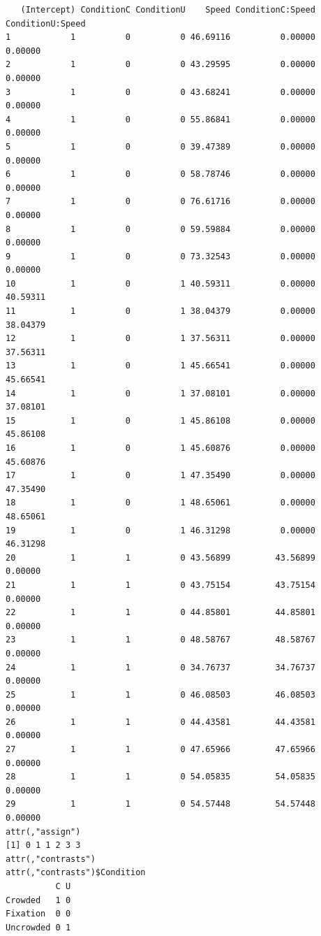\documentclass[
]{article}
\begin{document}
\begin{verbatim}
   (Intercept) ConditionC ConditionU    Speed ConditionC:Speed ConditionU:Speed
1            1          0          0 46.69116          0.00000          0.00000
2            1          0          0 43.29595          0.00000          0.00000
3            1          0          0 43.68241          0.00000          0.00000
4            1          0          0 55.86841          0.00000          0.00000
5            1          0          0 39.47389          0.00000          0.00000
6            1          0          0 58.78746          0.00000          0.00000
7            1          0          0 76.61716          0.00000          0.00000
8            1          0          0 59.59884          0.00000          0.00000
9            1          0          0 73.32543          0.00000          0.00000
10           1          0          1 40.59311          0.00000         40.59311
11           1          0          1 38.04379          0.00000         38.04379
12           1          0          1 37.56311          0.00000         37.56311
13           1          0          1 45.66541          0.00000         45.66541
14           1          0          1 37.08101          0.00000         37.08101
15           1          0          1 45.86108          0.00000         45.86108
16           1          0          1 45.60876          0.00000         45.60876
17           1          0          1 47.35490          0.00000         47.35490
18           1          0          1 48.65061          0.00000         48.65061
19           1          0          1 46.31298          0.00000         46.31298
20           1          1          0 43.56899         43.56899          0.00000
21           1          1          0 43.75154         43.75154          0.00000
22           1          1          0 44.85801         44.85801          0.00000
23           1          1          0 48.58767         48.58767          0.00000
24           1          1          0 34.76737         34.76737          0.00000
25           1          1          0 46.08503         46.08503          0.00000
26           1          1          0 44.43581         44.43581          0.00000
27           1          1          0 47.65966         47.65966          0.00000
28           1          1          0 54.05835         54.05835          0.00000
29           1          1          0 54.57448         54.57448          0.00000
attr(,"assign")
[1] 0 1 1 2 3 3
attr(,"contrasts")
attr(,"contrasts")$Condition
          C U
Crowded   1 0
Fixation  0 0
Uncrowded 0 1
\end{verbatim}
\end{document}
